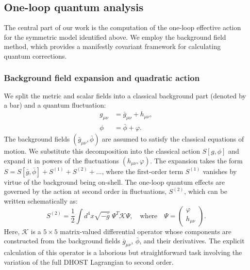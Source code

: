 \documentclass[twocolumn]{aastex631}
\begin{document}
\subsection{One-loop quantum analysis}
The central part of our work is the computation of the one-loop effective action for the symmetric model identified above. We employ the background field method, which provides a manifestly covariant framework for calculating quantum corrections.

\subsubsection{Background field expansion and quadratic action}
We split the metric and scalar fields into a classical background part (denoted by a bar) and a quantum fluctuation:
\begin{align}
    g_{\mu\nu} &= \bar{g}_{\mu\nu} + h_{\mu\nu}, \\
    \phi &= \bar{\phi} + \varphi.
\end{align}
The background fields $(\bar{g}_{\mu\nu}, \bar{\phi})$ are assumed to satisfy the classical equations of motion. We substitute this decomposition into the classical action $S[g, \phi]$ and expand it in powers of the fluctuations $(h_{\mu\nu}, \varphi)$. The expansion takes the form $S = S[\bar{g}, \bar{\phi}] + S^{(1)} + S^{(2)} + \dots$, where the first-order term $S^{(1)}$ vanishes by virtue of the background being on-shell. The one-loop quantum effects are governed by the action at second order in fluctuations, $S^{(2)}$, which can be written schematically as:
\begin{equation}
    S^{(2)} = \frac{1}{2} \int d^4x \sqrt{-\bar{g}} \; \Psi^T \mathcal{K} \Psi, \quad \text{where} \quad \Psi = \begin{pmatrix} \varphi \\ h_{\mu\nu} \end{pmatrix}.
\end{equation}
Here, $\mathcal{K}$ is a $5 \times 5$ matrix-valued differential operator whose components are constructed from the background fields $\bar{g}_{\mu\nu}$, $\bar{\phi}$, and their derivatives. The explicit calculation of this operator is a laborious but straightforward task involving the variation of the full DHOST Lagrangian to second order.
\end{document}
